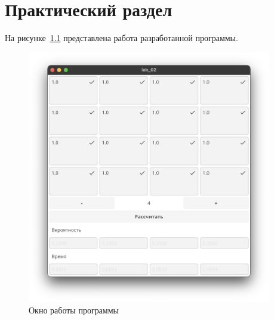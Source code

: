 \chapter{Практический раздел}

На рисунке~\ref{fig:screen} представлена работа разработанной программы.

\begin{figure}[ht]
    \centering
    \includegraphics[width=0.95\textwidth]{assets/screen.jpeg}
    \caption{Окно работы программы}
    \label{fig:screen}
\end{figure}